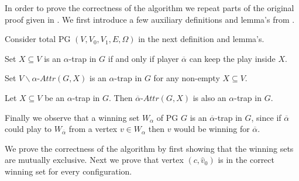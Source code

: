 In order to prove the correctness of the algorithm we repeat parts of the original proof given in \cite{ZIELONKA1998135}. We first introduce a few auxiliary definitions and lemma's from \cite{ZIELONKA1998135}.

Consider total PG $(V,V_0,V_1,E,\Omega)$ in the next definition and lemma's.
\begin{definition}\cite{ZIELONKA1998135}
Set $X \subseteq V$ is an $\alpha$-trap in $G$ if and only if player $\overline{\alpha}$ can keep the play inside $X$.
\end{definition}
\begin{lemma}\label{lem_attr_is_trap}
	\cite{ZIELONKA1998135}
	Set $V\backslash \alpha\textit{-Attr}(G,X)$ is an $\alpha$-trap in $G$ for any non-empty $X \subseteq V$.
\end{lemma}
\begin{lemma}
	\label{lem_attr_trap_is_trap}\cite{ZIELONKA1998135}
	Let $X \subseteq V$ be an $\alpha$-trap in $G$. Then $\overline{\alpha}\textit{-Attr}(G,X)$ is also an $\alpha$-trap in $G$.
\end{lemma}
Finally we observe that a winning set $W_\alpha$ of PG $G$ is an $\overline{\alpha}$-trap in $G$, since if $\overline{\alpha}$ could play to $W_{\overline{\alpha}}$ from a vertex $v \in W_\alpha$ then $v$ would be winning for $\overline{\alpha}$.

We prove the correctness of the algorithm by first showing that the winning sets are mutually exclusive. Next we prove that vertex $(c,\hat{v}_0)$ is in the correct winning set for every configuration.

